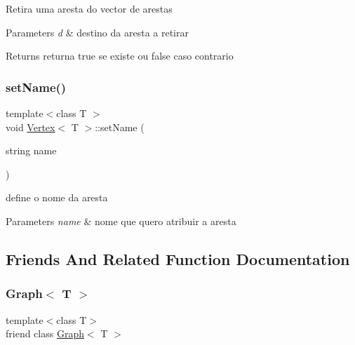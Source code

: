 Retira uma aresta do vector de arestas 
\begin{DoxyParams}{Parameters}
{\em d} & destino da aresta a retirar \\
\hline
\end{DoxyParams}
\begin{DoxyReturn}{Returns}
returna true se existe ou false caso contrario 
\end{DoxyReturn}
\mbox{\label{class_vertex_aee1d15f2efc9c7baecff72265beb1acf}} 
\subsubsection{\texorpdfstring{set\+Name()}{setName()}}
{\footnotesize\ttfamily template$<$class T $>$ \\
void \mbox{\hyperlink{class_vertex}{Vertex}}$<$ T $>$\+::set\+Name (\begin{DoxyParamCaption}\item[{string}]{name }\end{DoxyParamCaption})}

define o nome da aresta 
\begin{DoxyParams}{Parameters}
{\em name} & nome que quero atribuir a aresta \\
\hline
\end{DoxyParams}


\subsection{Friends And Related Function Documentation}
\mbox{\label{class_vertex_aefa9b76cd57411c5354e5620dc2d84dd}} 
\subsubsection{\texorpdfstring{Graph$<$ T $>$}{Graph< T >}}
{\footnotesize\ttfamily template$<$class T$>$ \\
friend class \mbox{\hyperlink{class_graph}{Graph}}$<$ T $>$\hspace{0.3cm}{\ttfamily [friend]}}

\mbox{\label{class_vertex_ae53e0b4fec14b9f1eaa8a4f8cd426e9e}} 
